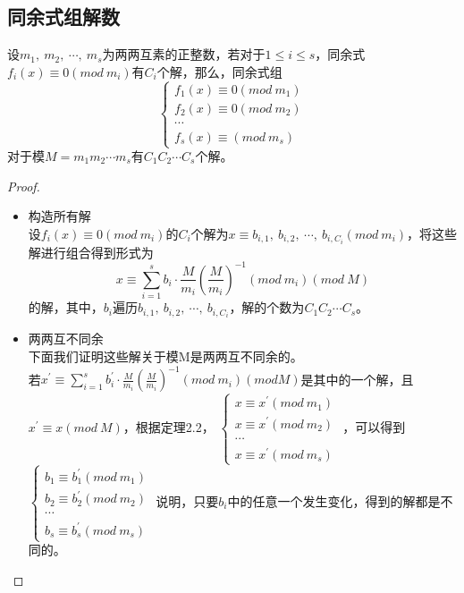 \documentclass[cn,10pt]{elegantbook}
\begin{document}
\subsection{同余式组解数}
\begin{theorem}
  设$m_1,\ m_2,\ \cdots ,\ m_s$为两两互素的正整数，若对于$1 \leq i \leq s$，同余式$f_i(x) \equiv 0(mod\ m_i)$有$C_i$个解，那么，同余式组
  \[
    \left\{
    \begin{matrix}
      f_1(x) \equiv 0(mod\ m_1)
      \\f_2(x) \equiv 0(mod\ m_2)
      \\ \cdots
      \\f_s(x) \equiv (mod\ m_s)
    \end{matrix}
    \right.
  \]
  对于模$M = m_1m_2 \cdots m_s$有$C_1C_2 \cdots C_s$个解。
\end{theorem}
\begin{proof}
  \begin{itemize}
    \item 构造所有解
          \\设$f_i(x) \equiv 0(mod\ m_i)$的$C_i$个解为$x \equiv b_{i,1},\ b_{i,2},\ \cdots ,\ b_{i,C_i}(mod\ m_i)$，将这些解进行组合得到形式为
          \begin{equation*}
           x \equiv \sum_{i=1}^{s}b_i \cdot \frac{M}{m_i}(\frac{M}{m_i})^{-1}(mod\ m_i)(mod\ M)
          \end{equation*}
        的解，其中，$b_i$遍历$b_{i,1},\ b_{i,2},\ \cdots ,\ b_{i,C_i}$，解的个数为$C_1C_2 \cdots C_s$。
    \item 两两互不同余\\
    下面我们证明这些解关于模M是两两互不同余的。\\
    若$x^{\prime} \equiv  \sum_{i=1}^s b_i^{\prime} \cdot \frac{M}{m_i}(\frac{M}{m_i})^{-1}(mod\ m_i)(mod M)$是其中的一个解，且$x^{\prime} \equiv x(mod\ M)$，根据定理2.2，
    $
      \left\{
        \begin{matrix}
          x \equiv x^{\prime}(mod\ m_1)
          \\ x\equiv x^{\prime}(mod\ m_2)
          \\ \cdots
          \\x \equiv x^{\prime}(mod\ m_s)
        \end{matrix}
      \right.
    $
    ，可以得到
    $
     \left\{
       \begin{matrix}
         b_1 \equiv b_1^{\prime}(mod\ m_1)
         \\b_2 \equiv b_2^{\prime}(mod\ m_2)
         \\ \cdots
         \\b_s \equiv b_s^{\prime}(mod\ m_s)
       \end{matrix}
     \right.
    $
    说明，只要$b_i$中的任意一个发生变化，得到的解都是不同的。
  \end{itemize}
\end{proof}
\end{document}
